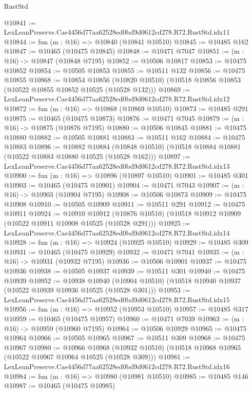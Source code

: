 \begin{lexlean}{RustStd}
\begin{coremodule}
@10841 := LexLeanPreserve.Cae4456d77aa62528ed0bd9d0612cd278.R72.RustStd.idx11
@10844 := fun (m : @16) => @10840 (@10841 @10510)
@10845 := @10485 @162
@10847 := @10465 (@10475 @10845)
@10848 := @10471 @7047
@10851 := (m : @16) -> @10847 (@10848 @7195)
@10852 := @10506 @10817
@10853 := @10475 @10852
@10854 := @10505 @10853
@10855 := @10511 @132
@10856 := @10475 @10855
@10868 := @10854
    @10856
    (@10820 @10510)
    (@10518 @10856 @10853 (@10522 @10855 @10852 @10525 (@10528 @132)))
@10869 := LexLeanPreserve.Cae4456d77aa62528ed0bd9d0612cd278.R72.RustStd.idx12
@10872 := fun (m : @16) => @10868 (@10869 @10510)
@10873 := @10485 @291
@10875 := @10465 (@10475 @10873)
@10876 := @10471 @7045
@10879 := (m : @16) -> @10875 (@10876 @7195)
@10880 := @10506 @10845
@10881 := @10475 @10880
@10882 := @10505 @10881
@10883 := @10511 @162
@10884 := @10475 @10883
@10896 := @10882
    @10884
    (@10848 @10510)
    (@10518 @10884 @10881 (@10522 @10883 @10880 @10525 (@10528 @162)))
@10897 := LexLeanPreserve.Cae4456d77aa62528ed0bd9d0612cd278.R72.RustStd.idx13
@10900 := fun (m : @16) => @10896 (@10897 @10510)
@10901 := @10485 @301
@10903 := @10465 (@10475 @10901)
@10904 := @10471 @7043
@10907 := (m : @16) -> @10903 (@10904 @7195)
@10908 := @10506 @10873
@10909 := @10475 @10908
@10910 := @10505 @10909
@10911 := @10511 @291
@10912 := @10475 @10911
@10924 := @10910
    @10912
    (@10876 @10510)
    (@10518 @10912 @10909 (@10522 @10911 @10908 @10525 (@10528 @291)))
@10925 := LexLeanPreserve.Cae4456d77aa62528ed0bd9d0612cd278.R72.RustStd.idx14
@10928 := fun (m : @16) => @10924 (@10925 @10510)
@10929 := @10485 @309
@10931 := @10465 (@10475 @10929)
@10932 := @10471 @7041
@10935 := (m : @16) -> @10931 (@10932 @7195)
@10936 := @10506 @10901
@10937 := @10475 @10936
@10938 := @10505 @10937
@10939 := @10511 @301
@10940 := @10475 @10939
@10952 := @10938
    @10940
    (@10904 @10510)
    (@10518 @10940 @10937 (@10522 @10939 @10936 @10525 (@10528 @301)))
@10953 := LexLeanPreserve.Cae4456d77aa62528ed0bd9d0612cd278.R72.RustStd.idx15
@10956 := fun (m : @16) => @10952 (@10953 @10510)
@10957 := @10485 @317
@10959 := @10465 (@10475 @10957)
@10960 := @10471 @7039
@10963 := (m : @16) -> @10959 (@10960 @7195)
@10964 := @10506 @10929
@10965 := @10475 @10964
@10966 := @10505 @10965
@10967 := @10511 @309
@10968 := @10475 @10967
@10980 := @10966
    @10968
    (@10932 @10510)
    (@10518 @10968 @10965 (@10522 @10967 @10964 @10525 (@10528 @309)))
@10981 := LexLeanPreserve.Cae4456d77aa62528ed0bd9d0612cd278.R72.RustStd.idx16
@10984 := fun (m : @16) => @10980 (@10981 @10510)
@10985 := @10485 @146
@10987 := @10465 (@10475 @10985)

\end{coremodule}
\end{lexlean}
